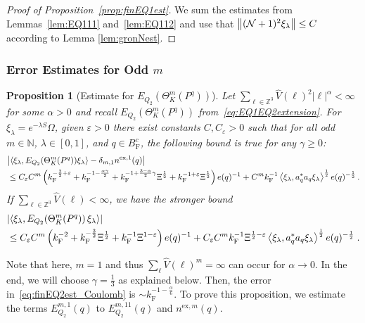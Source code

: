 \documentclass[12pt,a4paper]{article}
\numberwithin{equation}{section}
\newcommand{\NNN}{\mathbb{N}}
\newcommand{\1}{\mathbb{I}}
\newcommand{\ex}{\mathrm{ex}}
\newcommand{\F}{\mathrm{F}}
\newcommand{\kF}{k_\F}
\newcommand{\Zstar}{\mathbb{Z}^3} %
\newcommand{\Z}{\mathbb{Z}}
\newcommand{\NN}{\mathcal{N}}
\newcommand{\half}{\frac{1}{2}}
\newcommand{\eva}[1]{\left\langle #1 \right\rangle}
\theoremstyle{plain}
\newtheorem{proposition}[theorem]{Proposition}
\theoremstyle{definition}
\theoremstyle{remark}
\theoremstyle{plain}
\theoremstyle{definition}
\theoremstyle{remark}
\begin{document}
\begin{proof}[Proof of Proposition~\ref{prop:finEQ1est}]
We sum the estimates from Lemmas~\ref{lem:EQ111} and~\ref{lem:EQ112} and use that $ \norm{(\NN+1)^2 \xi_\lambda} \le C $ according to Lemma \ref{lem:gronNest}.
\end{proof}






\subsubsection{Error Estimates for Odd $m$}


\begin{proposition}[Estimate for $E_{Q_2}(\Theta^m_{K}(P^q))$]\label{prop:finEQ2est}
Let $ \sum_{\ell \in \Zstar} \hat{V}(\ell)^2 |\ell|^\alpha < \infty $ for some $ \alpha > 0 $ and recall $ E_{Q_2}(\Theta^m_K(P^q)) $ from~\eqref{eq:EQ1EQ2extension}. For $\xi_\lambda = e^{-\lambda S} \Omega$, given $ \varepsilon > 0 $ there exist constants $ C, C_\varepsilon > 0 $ such that for all odd $ m \in \NNN $, $ \lambda \in [0,1] $, and $ q \in B_{\F}^c $, the following bound is true for any $ \gamma \ge 0 $:
\begin{align}
	&\abs{\eva{\xi_\lambda,  E_{Q_2}(\Theta^m_K(P^q)) \xi_\lambda} - \delta_{m,1} n^{\ex,1}(q)} \label{eq:finEQ2est_Coulomb} \\
	&\leq C_\varepsilon C^m \left( \kF^{-\frac 32 + \varepsilon}
		+ \kF^{-1 - \frac{\alpha \gamma}{2}}
		+ \kF^{-1+ \frac{3-\alpha}{2} \gamma} \Xi^\half
		+ \kF^{-1+\varepsilon} \Xi^\half \right) e(q)^{-1} + C^m \kF^{-1} \eva{\xi_\lambda, a_q^* a_q \xi_\lambda}^{\half} e(q)^{-\half}  \,. \nonumber
\end{align}
If $ \sum_{\ell \in \Zstar} \hat{V}(\ell) < \infty $, we have the stronger bound
\begin{equation}\label{eq:finEQ2est}
\begin{split}
	&\abs{\eva{\xi_\lambda, E_{Q_2}\!\left(\Theta^m_K(P^q)\right) \xi_\lambda}} \\
	&\leq C_\varepsilon C^m \left( \kF^{-2}
		+ \kF^{-\frac{3}{2}} \Xi^\half
		+ \kF^{-1} \Xi^{1-\varepsilon} \right) e(q)^{-1}
		+ C_\varepsilon C^m \kF^{-1} \Xi^{\half - \varepsilon} \eva{\xi_\lambda, a_q^* a_q \xi_\lambda}^{\half} e(q)^{-\half} \;.
\end{split}
\end{equation}
\end{proposition}


Note that here, $ m = 1 $ and thus $ \sum_\ell \hat{V}(\ell)^m = \infty $ can occur for $ \alpha \to 0 $. In the end, we will choose $ \gamma = \frac 13 $ as explained below. Then, the error in~\eqref{eq:finEQ2est_Coulomb} is $ \sim \kF^{-1-\frac {\alpha}{6}} $.
To prove this proposition, we estimate the terms $ E^{m,1}_{Q_2}(q) $ to $ E^{m,11}_{Q_2} (q)$ and $ n^{\ex,m}(q) $.
\end{document}
